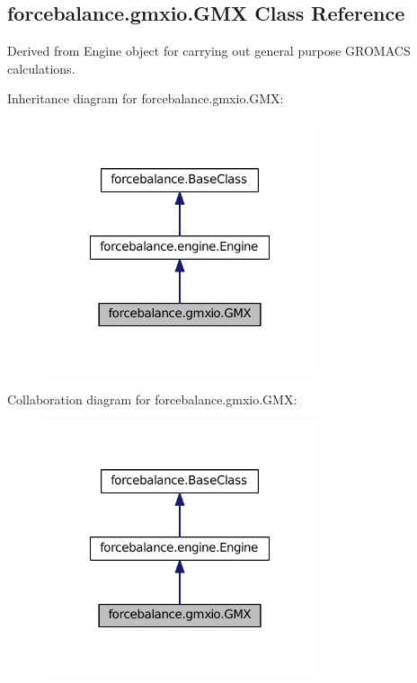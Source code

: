\hypertarget{classforcebalance_1_1gmxio_1_1GMX}{\subsection{forcebalance.\-gmxio.\-G\-M\-X \-Class \-Reference}
\label{classforcebalance_1_1gmxio_1_1GMX}
}


\-Derived from \-Engine object for carrying out general purpose \-G\-R\-O\-M\-A\-C\-S calculations.  




\-Inheritance diagram for forcebalance.\-gmxio.\-G\-M\-X\-:
\nopagebreak
\begin{figure}[H]
\begin{center}
\leavevmode
\includegraphics[width=228pt]{classforcebalance_1_1gmxio_1_1GMX__inherit__graph}
\end{center}
\end{figure}


\-Collaboration diagram for forcebalance.\-gmxio.\-G\-M\-X\-:
\nopagebreak
\begin{figure}[H]
\begin{center}
\leavevmode
\includegraphics[width=228pt]{classforcebalance_1_1gmxio_1_1GMX__coll__graph}
\end{center}
\end{figure}
